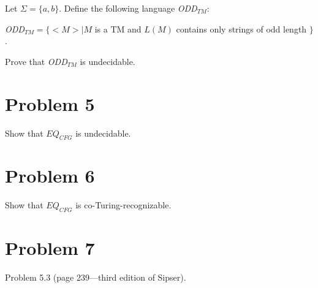 \documentclass[11pt]{article}
\begin{document}
Let $\Sigma=\{a,b\}$. Define the following language {\em ODD}$_{TM}$:

{\em ODD}$_{TM}=\{ <M>|M$ is a TM and $L(M)$ contains only strings of odd length $\}$.

Prove that {\em ODD}$_{TM}$ is undecidable.

\section*{Problem 5}

Show that $EQ_{CFG}$ is undecidable.
\newline

\section*{Problem 6}

Show that $EQ_{CFG}$ is co-Turing-recognizable.
\newline

\section*{Problem 7}

Problem 5.3 (page 239---third edition of Sipser).
\newline
\end{document}

